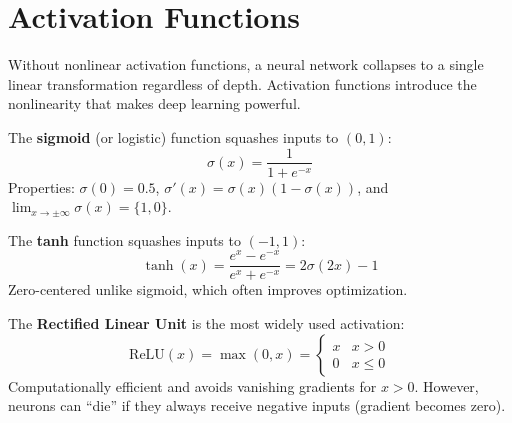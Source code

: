 \section{Activation Functions}

Without nonlinear activation functions, a neural network collapses to a single linear transformation regardless of depth. Activation functions introduce the nonlinearity that makes deep learning powerful.

\begin{definition}[Sigmoid]
    The \textbf{sigmoid} (or logistic) function squashes inputs to $(0, 1)$:
    \[
        \sigma(x) = \frac{1}{1 + e^{-x}}
    \]
    Properties: $\sigma(0) = 0.5$, $\sigma'(x) = \sigma(x)(1 - \sigma(x))$, and $\lim_{x \to \pm\infty} \sigma(x) = \{1, 0\}$.
\end{definition}

\begin{definition}
    The \textbf{tanh} function squashes inputs to $(-1, 1)$:
    \[
        \tanh(x) = \frac{e^x - e^{-x}}{e^x + e^{-x}} = 2\sigma(2x) - 1
    \]
    Zero-centered unlike sigmoid, which often improves optimization.
\end{definition}

\begin{definition}[ReLU]
    The \textbf{Rectified Linear Unit} is the most widely used activation:
    \[
        \text{ReLU}(x) = \max(0, x) = \begin{cases} x & x > 0 \\ 0 & x \leq 0 \end{cases}
    \]
    Computationally efficient and avoids vanishing gradients for $x > 0$. However, neurons can ``die'' if they always receive negative inputs (gradient becomes zero).
\end{definition}

